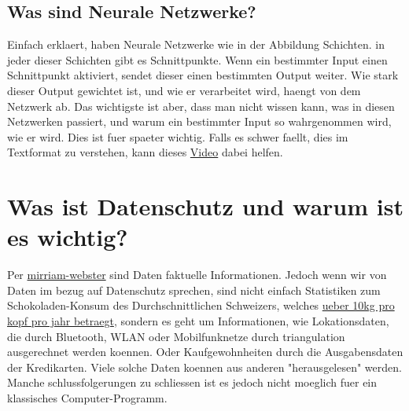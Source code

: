 \documentclass{report}
\begin{document}
\subsection{Was sind Neurale Netzwerke?}
Einfach erklaert, haben Neurale Netzwerke wie in der Abbildung Schichten. in jeder dieser Schichten gibt es Schnittpunkte. Wenn ein bestimmter Input einen Schnittpunkt aktiviert, sendet dieser einen bestimmten Output weiter. Wie stark dieser Output gewichtet ist, und wie er verarbeitet wird, haengt von dem Netzwerk ab.
Das wichtigste ist aber, dass man nicht wissen kann, was in diesen Netzwerken passiert, und warum ein bestimmter Input so wahrgenommen wird, wie er wird. Dies ist fuer spaeter wichtig.
\newline
Falls es schwer faellt, dies im Textformat zu verstehen, kann dieses \hyperlink{https://youtube.com/watch?v=p6CfR3Wpz7Y&t=390}{Video} dabei helfen.

\section{Was ist Datenschutz und warum ist es wichtig?}
Per \hyperlink{https://www.merriam-webster.com/dictionary/data}{mirriam-webster} sind Daten faktuelle Informationen.
Jedoch wenn wir von Daten im bezug auf Datenschutz sprechen, sind nicht einfach Statistiken zum Schokoladen-Konsum des Durchschnittlichen Schweizers, welches \hyperlink{https://de.statista.com/statistik/daten/studie/369440/umfrage/pro-kopf-konsum-von-schokolade-in-der-schweiz/}{ueber 10kg pro kopf pro jahr betraegt},
sondern es geht um Informationen, wie Lokationsdaten, die durch Bluetooth, WLAN oder Mobilfunknetze durch triangulation ausgerechnet werden koennen. Oder Kaufgewohnheiten durch die Ausgabensdaten der Kredikarten.
Viele solche Daten koennen aus anderen "herausgelesen" werden. Manche schlussfolgerungen zu schliessen ist es jedoch nicht moeglich fuer ein klassisches Computer-Programm.
\end{document}
